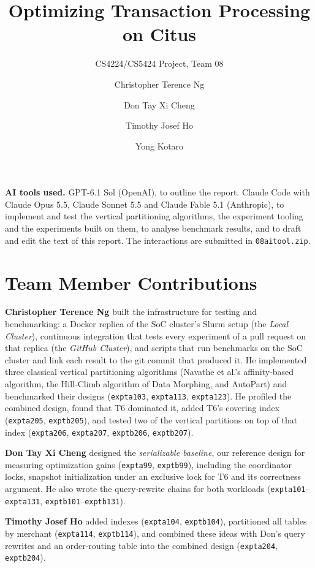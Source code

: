 \documentclass[sigconf,10pt,nonacm]{acmart}
\title{Optimizing Transaction Processing on Citus}
\subtitle{CS4224/CS5424 Project, Team 08}
\author{Christopher Terence Ng}
\affiliation{\institution{National University of Singapore}\country{Singapore}}
\author{Don Tay Xi Cheng}
\affiliation{\institution{National University of Singapore}\country{Singapore}}
\author{Timothy Josef Ho}
\affiliation{\institution{National University of Singapore}\country{Singapore}}
\author{Yong Kotaro}
\affiliation{\institution{National University of Singapore}\country{Singapore}}
\newcommand{\expt}[1]{\texttt{expt\textunderscore #1}}
\renewcommand{\_}{\underscorewithoutbreak\allowbreak}
\begin{document}
\maketitle

\noindent\textbf{AI tools used.} GPT-6.1 Sol (OpenAI), to outline the report. Claude
Code with Claude Opus 5.5, Claude Sonnet 5.5 and Claude Fable 5.1 (Anthropic), to
implement and test the vertical partitioning algorithms, the experiment tooling and the
experiments built on them, to analyse benchmark results, and to draft and edit the text
of this report. The interactions are submitted in \texttt{08\_ai\_tool.zip}.

\section{Team Member Contributions}
\label{sec:contributions}

\textbf{Christopher Terence Ng} built the infrastructure for testing and benchmarking:
a Docker replica of the SoC cluster's Slurm setup (the \emph{Local Cluster}),
continuous integration that tests every experiment of a pull request on that replica
(the \emph{GitHub Cluster}), and scripts that run benchmarks on the SoC cluster and
link each result to the git commit that produced it. He implemented three classical
vertical partitioning algorithms (Navathe et al.'s affinity-based algorithm, the
Hill-Climb algorithm of Data Morphing, and AutoPart) and benchmarked their designs
(\expt{a103}, \expt{a113}, \expt{a123}). He profiled the combined design, found that
T6 dominated it, added T6's covering index (\expt{a205}, \expt{b205}), and tested two of
the vertical partitions on top of that index (\expt{a206}, \expt{a207}, \expt{b206},
\expt{b207}).

\textbf{Don Tay Xi Cheng} designed the \emph{serializable baseline}, our reference
design for measuring optimization gains (\expt{a99},
\expt{b99}), including the coordinator locks, snapshot initialization under an exclusive lock for T6 and its
correctness argument. He also wrote the query-rewrite chains for both workloads
(\expt{a101}--\expt{a131}, \expt{b101}--\expt{b131}).

\textbf{Timothy Josef Ho} added indexes (\expt{a104}, \expt{b104}), partitioned all
tables by merchant (\expt{a114}, \expt{b114}), and combined these ideas with Don's
query rewrites and an order-routing table into the combined design (\expt{a204},
\expt{b204}).
\end{document}
